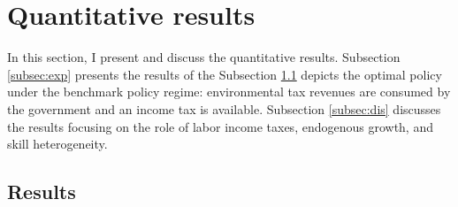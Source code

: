 \section{Quantitative results}\label{sec:res}


In this section, I present and discuss the quantitative results.
Subsection \ref{subsec:exp} presents the results of the 
Subsection \ref{subsec:mr} depicts the optimal policy under the benchmark policy regime: environmental tax revenues are consumed by the government and an income tax is available. Subsection \ref{subsec:dis} discusses the results focusing on the role of labor income taxes, endogenous growth, and skill heterogeneity. 



\subsection{Results}\label{subsec:mr}


